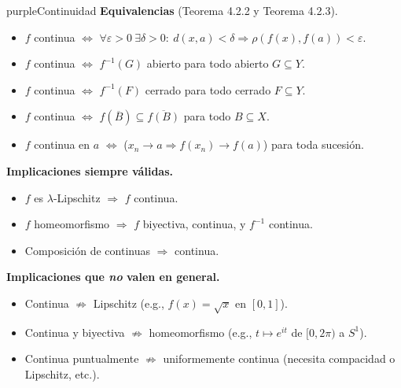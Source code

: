 \documentclass[11pt,twoside]{article}
\begin{document}
\begin{equivbox}{purple}{Continuidad}
\textbf{Equivalencias} (Teorema 4.2.2 y Teorema 4.2.3).
\begin{itemize}[leftmargin=2em,itemsep=2pt]
\item $f$ continua $\Leftrightarrow$ $\forall \varepsilon > 0\ \exists \delta > 0:\ d(x, a) < \delta \Rightarrow \rho(f(x), f(a)) < \varepsilon$.
\item $f$ continua $\Leftrightarrow$ $f^{-1}(G)$ abierto para todo abierto $G \subseteq Y$.
\item $f$ continua $\Leftrightarrow$ $f^{-1}(F)$ cerrado para todo cerrado $F \subseteq Y$.
\item $f$ continua $\Leftrightarrow$ $f(\overline{B}) \subseteq \overline{f(B)}$ para todo $B \subseteq X$.
\item $f$ continua en $a$ $\Leftrightarrow$ ($x_{n} \to a \Rightarrow f(x_{n}) \to f(a)$) para toda sucesión.
\end{itemize}

\textbf{Implicaciones siempre válidas.}
\begin{itemize}[leftmargin=2em,itemsep=2pt]
\item $f$ es $\lambda$-Lipschitz $\Rightarrow$ $f$ continua.
\item $f$ homeomorfismo $\Rightarrow$ $f$ biyectiva, continua, y $f^{-1}$ continua.
\item Composición de continuas $\Rightarrow$ continua.
\end{itemize}

\textbf{Implicaciones que \emph{no} valen en general.}
\begin{itemize}[leftmargin=2em,itemsep=2pt]
\item Continua $\not\Rightarrow$ Lipschitz (e.g., $f(x) = \sqrt{x}$ en $[0, 1]$).
\item Continua y biyectiva $\not\Rightarrow$ homeomorfismo (e.g., $t \mapsto e^{it}$ de $[0, 2\pi)$ a $S^{1}$).
\item Continua puntualmente $\not\Rightarrow$ uniformemente continua (necesita compacidad o Lipschitz, etc.).
\end{itemize}
\end{equivbox}

\medskip
\end{document}
